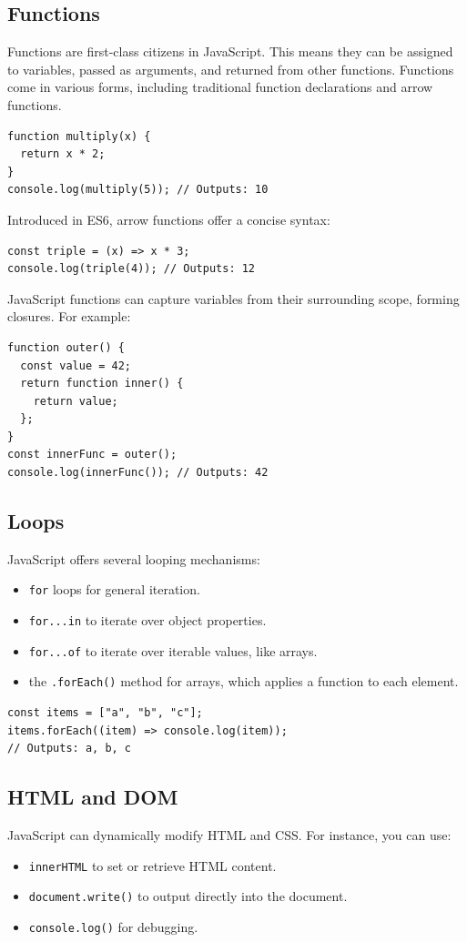 \subsection*{Functions}
Functions are first-class citizens in JavaScript. This means they can be assigned to variables, passed as arguments, and returned from other functions. Functions come in various forms, including traditional function declarations and arrow functions.
\begin{verbatim}
function multiply(x) {
  return x * 2;
}
console.log(multiply(5)); // Outputs: 10
\end{verbatim}
Introduced in ES6, arrow functions offer a concise syntax:
\begin{verbatim}
const triple = (x) => x * 3;
console.log(triple(4)); // Outputs: 12
\end{verbatim}
JavaScript functions can capture variables from their surrounding scope, forming closures. For example:
\begin{verbatim}
function outer() {
  const value = 42;
  return function inner() {
    return value;
  };
}
const innerFunc = outer();
console.log(innerFunc()); // Outputs: 42
\end{verbatim}

\subsection*{Loops}
JavaScript offers several looping mechanisms:
\begin{itemize}
    \item \texttt{for} loops for general iteration.
    \item \texttt{for...in} to iterate over object properties.
    \item \texttt{for...of} to iterate over iterable values, like arrays.
    \item the \texttt{.forEach()} method for arrays, which applies a function to each element.
\end{itemize}

\begin{verbatim}
const items = ["a", "b", "c"];
items.forEach((item) => console.log(item));
// Outputs: a, b, c
\end{verbatim}

\subsection*{HTML and DOM}
JavaScript can dynamically modify HTML and CSS. For instance, you can use:
\begin{itemize}
    \item \texttt{innerHTML} to set or retrieve HTML content.
    \item \texttt{document.write()} to output directly into the document.
    \item \texttt{console.log()} for debugging.
\end{itemize}

